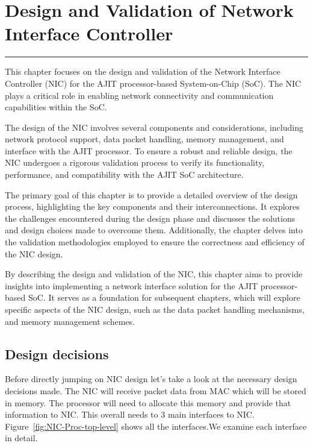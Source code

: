 \documentclass[12pt]{report}
\begin{document}

\chapter{Design and Validation of Network Interface Controller} \label{2}
\rule[10pt]{\linewidth}{3pt}
This chapter focuses on the design and validation of the Network Interface Controller (NIC) for the AJIT processor-based System-on-Chip (SoC). The NIC plays a critical role in enabling network connectivity and communication capabilities within the SoC.

The design of the NIC involves several components and considerations, including network protocol support, data packet handling, memory management, and interface with the AJIT processor. To ensure a robust and reliable design, the NIC undergoes a rigorous validation process to verify its functionality, performance, and compatibility with the AJIT SoC architecture.

The primary goal of this chapter is to provide a detailed overview of the design process, highlighting the key components and their interconnections. It explores the challenges encountered during the design phase and discusses the solutions and design choices made to overcome them. Additionally, the chapter delves into the validation methodologies employed to ensure the correctness and efficiency of the NIC design.

By describing the design and validation of the NIC, this chapter aims to provide insights into implementing a network interface solution for the AJIT processor-based SoC. It serves as a foundation for subsequent chapters, which will explore specific aspects of the NIC design, such as the data packet handling mechanisms, and memory management schemes.

	
	\section{Design decisions}
		Before directly jumping on NIC design let's take a look at the necessary design decisions made. The NIC will receive packet data from MAC
		which will be stored in memory. The processor will need to allocate this memory and provide that information to NIC. This overall needs to
		3 main interfaces to NIC. Figure~\ref{fig:NIC-Proc-top-level} shows all the interfaces.We examine each interface in detail.	
\end{document}
